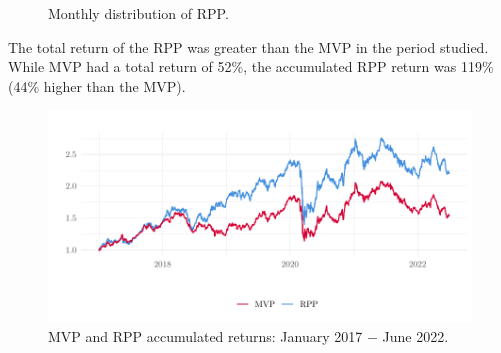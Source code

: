 \begin{figure}[H]
	\begin{subfigmatrix}{2}
	\end{subfigmatrix}
	\caption{Monthly distribution of RPP.}
	\label{fig:totalRiskPPP}
\end{figure}

The total return of the RPP was greater than the MVP in the period studied. While MVP had a total return of 52\%, the accumulated RPP return was 119\% (44\% higher than the MVP).

\begin{figure}[H]
	\centering
	\includegraphics{figures/retornoRPPMVP.pdf}
	\caption{MVP and RPP accumulated returns: January 2017 $-$ June 2022.}
	\label{fig:retornoRPPMVP}
\end{figure}

